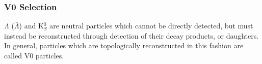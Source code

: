 \subsubsection{V0 Selection}
\label{V0Selection}

$\Lambda$ ($\bar{\Lambda}$) and K$^{0}_{S}$ are neutral particles which cannot be directly detected, but must instead be reconstructed through detection of their decay products, or daughters.  In general, particles which are topologically reconstructed in this fashion are called V0 particles.


